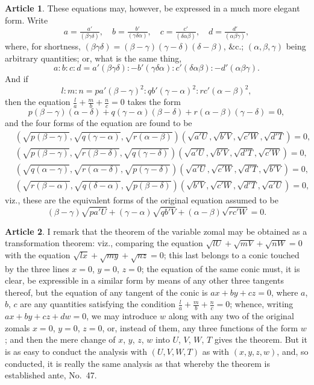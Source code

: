 \documentclass[11pt,a4paper]{article}
\theoremstyle{definition}
\newtheorem{art}{Article}
\begin{document}
\begin{art}
These equations may, however, be expressed in a much more elegant form. Write
\[
a = \tfrac{a'}{(\beta\gamma\delta)}, \quad b = \tfrac{b'}{(\gamma\delta\alpha)}, \quad c = \tfrac{c'}{(\delta\alpha\beta)}, \quad d = \tfrac{d'}{(\alpha\beta\gamma)},
\]
where, for shortness, $(\beta\gamma\delta) = (\beta - \gamma)(\gamma - \delta)(\delta - \beta)$, \&c.; $(\alpha, \beta, \gamma)$ being arbitrary quantities; or, what is the same thing,
\[
a : b : c : d = a'(\beta\gamma\delta) : -b'(\gamma\delta\alpha) : c'(\delta\alpha\beta) : -d'(\alpha\beta\gamma).
\]
And if
\[
l : m : n = pa'(\beta - \gamma)^{2} : qb'(\gamma - \alpha)^{2} : rc'(\alpha - \beta)^{2},
\]
then the equation $\tfrac{l}{a} + \tfrac{m}{b} + \tfrac{n}{c} = 0$ takes the form
\[
p(\beta - \gamma)(\alpha - \delta) + q(\gamma - \alpha)(\beta - \delta) + r(\alpha - \beta)(\gamma - \delta) = 0,
\]
and the four forms of the equation are found to be
\begin{align*}
&\left(\sqrt{p(\beta - \gamma)}, \sqrt{q(\gamma - \alpha)}, \sqrt{r(\alpha - \beta)}\right)(\sqrt{a'U}, \sqrt{b'V}, \sqrt{c'W}, \sqrt{d'T}) = 0, \\
&\left(\sqrt{p(\beta - \gamma)}, \sqrt{r(\beta - \delta)}, \sqrt{q(\gamma - \delta)}\right)(\sqrt{a'U}, \sqrt{b'V}, \sqrt{d'T}, \sqrt{c'W}) = 0, \\
&\left(\sqrt{q(\alpha - \gamma)}, \sqrt{r(\alpha - \delta)}, \sqrt{p(\gamma - \delta)}\right)(\sqrt{a'U}, \sqrt{c'W}, \sqrt{d'T}, \sqrt{b'V}) = 0, \\
&\left(\sqrt{r(\beta - \alpha)}, \sqrt{q(\delta - \alpha)}, \sqrt{p(\beta - \delta)}\right)(\sqrt{b'V}, \sqrt{c'W}, \sqrt{d'T}, \sqrt{a'U}) = 0,
\end{align*}
viz., these are the equivalent forms of the original equation assumed to be
\[
(\beta - \gamma)\sqrt{pa'U} + (\gamma - \alpha)\sqrt{qb'V} + (\alpha - \beta)\sqrt{rc'W} = 0.
\]
\end{art}

\begin{art}
I remark that the theorem of the variable zomal may be obtained as a transformation theorem: viz., comparing the equation $\sqrt{lU} + \sqrt{mV} + \sqrt{nW} = 0$ with the equation $\sqrt{lx} + \sqrt{my} + \sqrt{nz} = 0$; this last belongs to a conic touched by the three lines $x = 0$, $y = 0$, $z = 0$; the equation of the same conic must, it is clear, be expressible in a similar form by means of any other three tangents thereof, but the equation of any tangent of the conic is $ax + by + cz = 0$, where $a$, $b$, $c$ are any quantities satisfying the condition $\tfrac{l}{a} + \tfrac{m}{b} + \tfrac{n}{c} = 0$; whence, writing $ax + by + cz + dw = 0$, we may introduce $w$ along with any two of the original zomals $x = 0$, $y = 0$, $z = 0$, or, instead of them, any three functions of the form $w$; and then the mere change of $x$, $y$, $z$, $w$ into $U$, $V$, $W$, $T$ gives the theorem. But it is as easy to conduct the analysis with $(U, V, W, T)$ as with $(x, y, z, w)$, and, so conducted, it is really the same analysis as that whereby the theorem is established ante, No.\ 47.
\end{art}
\end{document}
